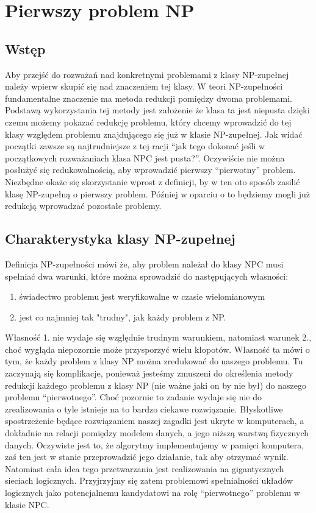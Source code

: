 \long{}
\chapter{Pierwszy problem NP}

\section{Wstęp}

Aby przejść do rozważań nad konkretnymi problemami z klasy NP-zupełnej należy wpierw skupić się nad znaczeniem tej klasy. W teori NP-zupełności fundamentalne znaczenie ma metoda redukcji pomiędzy dwoma problemami. Podstawą wykorzystania tej metody jest założenie że klasa ta jest niepusta dzięki czemu możemy pokazać redukcję problemu, który chcemy wprowadzić do tej klasy względem problemu znajdującego się już w klasie NP-zupełnej. Jak widać początki zawsze są najtrudniejsze z tej racji “jak tego dokonać jeśli w początkowych rozważaniach klasa NPC jest pusta?”. Oczywiście nie można posłużyć się redukowalnością, aby wprowadzić pierwszy “pierwotny” problem. Niezbędne okaże się skorzystanie wprost z definicji, by w ten oto sposób zasilić klasę NP-zupełną o pierwszy problem. Później w oparciu o to będziemy mogli już redukcją wprowadzać pozostałe problemy.

\section{Charakterystyka klasy NP-zupełnej}

Definicja NP-zupełności mówi że, aby problem należał do klasy NPC musi spełniać dwa warunki, które można sprowadzić do następujących własności:
\begin{enumerate}
\item świadectwo problemu jest weryfikowalne w czasie wielomianowym
\item jest co najmniej tak "trudny", jak każdy problem z NP.
\end{enumerate}

Własność 1. nie wydaje się względnie trudnym warunkiem, natomiast warunek 2., choć wygląda niepozornie może przysporzyć wielu kłopotów. Własność ta mówi o tym, że każdy problem z klasy NP można zredukować do naszego problemu. Tu zaczynają się komplikacje, ponieważ jesteśmy zmuszeni do określenia metody redukcji każdego problemu z klasy NP (nie ważne jaki on by nie był) do naszego problemu “pierwotnego”. Choć pozornie to zadanie wydaje się nie do zrealizowania o tyle istnieje na to bardzo ciekawe rozwiązanie. Błyskotliwe spostrzeżenie będące rozwiązaniem naszej zagadki jest ukryte w komputerach, a dokładnie na relacji pomiędzy modelem danych, a jego niższą warstwą fizycznych danych. Oczywiste jest to, że algorytmy implementujemy w pamięci komputera, zaś ten jest w stanie przeprowadzić jego działanie, tak aby otrzymać wynik. Natomiast cała idea tego przetwarzania jest realizowania na gigantycznych sieciach logicznych. Przyjrzyjmy się zatem problemowi spełnialności układów logicznych jako potencjalnemu kandydatowi na rolę “pierwotnego” problemu w klasie NPC.


